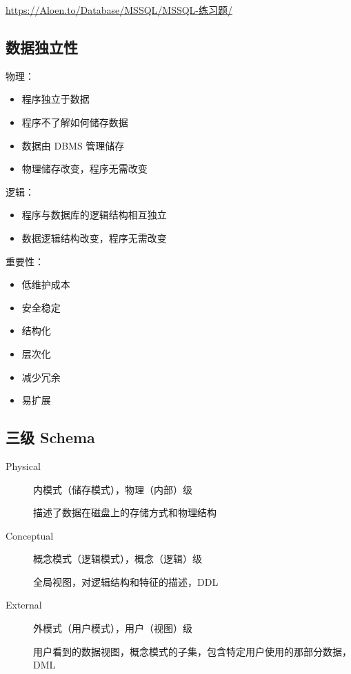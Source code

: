 \documentclass[11pt,journal,compsoc]{IEEEtran}
\begin{document}
\url{https://Aloen.to/Database/MSSQL/MSSQL-练习题/}

\subsection{数据独立性}

物理：

\begin{itemize}
    \item 程序独立于数据

    \item 程序不了解如何储存数据

    \item 数据由 DBMS 管理储存

    \item 物理储存改变，程序无需改变
\end{itemize}

逻辑：

\begin{itemize}
    \item 程序与数据库的逻辑结构相互独立

    \item 数据逻辑结构改变，程序无需改变
\end{itemize}

重要性：

\begin{itemize}
    \item 低维护成本

    \item 安全稳定

    \item 结构化

    \item 层次化

    \item 减少冗余

    \item 易扩展
\end{itemize}


\subsection{三级 Schema}

\begin{description}
    \item[Physical] 
    内模式（储存模式），物理（内部）级
    
    描述了数据在磁盘上的存储方式和物理结构

    \item[Conceptual]
    概念模式（逻辑模式），概念（逻辑）级
    
    全局视图，对逻辑结构和特征的描述，DDL

    \item[External]
    外模式（用户模式），用户（视图）级

    用户看到的数据视图，概念模式的子集，包含特定用户使用的那部分数据，DML
\end{description}
\end{document}
